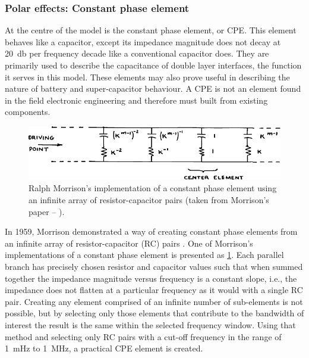    \subsubsection{Polar effects: Constant phase element}
      At the centre of the model is the constant phase element, or CPE.
      This element behaves like a capacitor, except its impedance magnitude does not decay at \SI{20}{\decibel} per frequency decade like a conventional capacitor does.
      They are primarily used to describe the capacitance of double layer interfaces, the function it serves in this model.
      These elements may also prove useful in describing the nature of battery and super-capacitor behaviour.
      A CPE is not an element found in the field electronic engineering and therefore must built from existing components.
      \begin{figure}[h]
        \centering
        \includegraphics{content/pt2/07-InterfaceModel/graphics/Morrison-RC}
        \caption{\label{graph:pt2-morrisonCPE}Ralph Morrison's implementation of a constant phase element using an infinite array of resistor-capacitor pairs (taken from Morrison's paper -- \cite{Morrison1959}).}
      \end{figure}
      In 1959, Morrison demonstrated a way of creating constant phase elements from an infinite array of resistor-capacitor (RC) pairs \cite{Morrison1959}.
      One of Morrison's implementations of a constant phase element is presented as \cref{graph:pt2-morrisonCPE}.
      Each parallel branch has precisely chosen resistor and capacitor values such that when summed together the impedance magnitude versus frequency is a constant slope, i.e., the impedance does not flatten at a particular frequency as it would with a single RC pair.
      Creating any element comprised of an infinite number of sub-elements is not possible, but by selecting only those elements that contribute to the bandwidth of interest the result is the same within the selected frequency window.
      Using that method and selecting only RC pairs with a cut-off frequency in the range of \SI{1}{\milli\hertz} to \SI{1}{\mega\hertz}, a practical CPE element is created.

